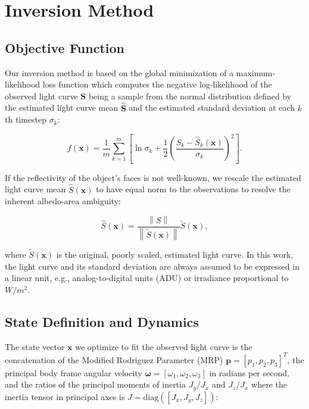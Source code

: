 \documentclass[a4paper,twocolumn]{spaceDebrisC} %
\newcommand{\vctr}[1]{\bm{#1}}
\newcommand{\norm}[1]{\left\lVert#1\right\rVert}
\begin{document}
\section{Inversion Method}

\subsection{Objective Function}

Our inversion method is based on the global minimization of a maximum-likelihood loss function which computes the negative log-likelihood of the observed light curve $\vctr{S}$ being a sample from the normal distribution defined by the estimated light curve mean $\hat{\vctr{S}}$ and the estimated standard deviation at each $k$th timestep $\sigma_k$:

\begin{equation} \label{eq:nll_loss}
 f(\vctr{x}) = \frac{1}{m}\sum_{k=1}^{m}\left[\ln\sigma_k + \frac{1}{2}\left(\frac{S_k - \hat{S}_k(\vctr{x})}{\sigma_k}\right)^2 \right].
 \end{equation}

If the reflectivity of the object's faces is not well-known, we rescale the estimated light curve mean $\hat{S}(\vctr{x})$ to have equal norm to the observations to resolve the inherent albedo-area ambiguity:

\begin{equation}
  \hat{S}(\vctr{x}) = \frac{\norm{S}}{\norm{\tilde{S}(\vctr{x})}} \tilde{S}(\vctr{x}),
\end{equation}

\noindent
where $\tilde{S}(\vctr{x})$ is the original, poorly scaled, estimated light curve. In this work, the light curve and its standard deviation are always assumed to be expressed in a linear unit, e.g., analog-to-digital units (ADU) or irradiance proportional to $W/m^2$.

\subsection{State Definition and Dynamics}

The state vector $\vctr{x}$ we optimize to fit the observed light curve is the concatenation of the Modified Rodriguez Parameter (MRP) $\vctr{p} = [p_1, p_2, p_3]^T$, the principal body frame angular velocity $\vctr{\omega} = [\omega_1, \omega_2, \omega_3]$ in radians per second, and the ratios of the principal moments of inertia $J_y / J_x$ and $J_z / J_x$ where the inertia tensor in principal axes is $J = \mathrm{diag}\left([J_x, J_y, J_z]\right)$:
\end{document}
